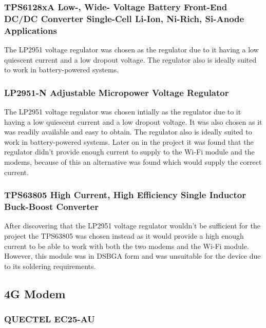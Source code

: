 \subsubsection{TPS6128xA Low-, Wide- Voltage Battery Front-End DC/DC Converter Single-Cell Li-Ion, Ni-Rich, Si-Anode Applications}

The LP2951 voltage regulator was chosen as the regulator due to it having a low quiescent current and a low dropout voltage. The regulator also is ideally suited to work in battery-powered systems. 

\subsubsection{LP2951-N Adjustable Micropower Voltage Regulator}

The LP2951 voltage regulator was chosen intially as the regulator due to it having a low quiescent current and a low dropout voltage. It was also chosen as it was readily available and easy to obtain. The regulator also is ideally suited to work in battery-powered systems. Later on in the project it was found that the regulator didn't provide enough current to supply to the Wi-Fi module and the modems, because of this an alternative was found which would supply the correct current.


\subsubsection{TPS63805 High Current, High Efficiency Single Inductor Buck-Boost Converter}

After discovering that the LP2951 voltage regulator wouldn't be sufficient for the project the TPS63805 was chosen instead as it would provide a high enough current to be able to work with both the two modems and the Wi-Fi module. However, this module was in DSBGA form and was unsuitable for the device due to its soldering requirements. 



\subsection{4G Modem}
\subsubsection{ QUECTEL EC25-AU}

